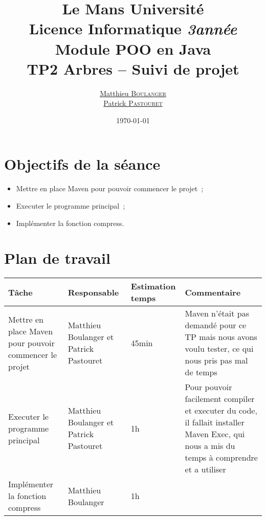 \documentclass[a4paper,11pt]{article}
\title {\textbf {\color {blue} Le Mans Université}\color{black}
\\  Licence Informatique  \textit {3\ieme année}
 \\Module POO en Java
 \\ \textbf {TP2 Arbres – Suivi de projet}}
\author{\href{mailto: matthieu.boulanger.etu@univ-lemans.fr} {Matthieu \textsc{Boulanger}}\\
      \href{mailto: patrick.pastouret.etu@univ-lemans.fr} {Patrick \textsc{Pastouret}}}
\date{\today}
\begin{document}
\maketitle

\section{Objectifs de la séance}
\begin{itemize}
    \item Mettre en place Maven pour pouvoir commencer le projet~;
    \item Executer le programme principal~;
    \item Implémenter la fonction compress.
\end{itemize}

\section{Plan de travail}
\begin{center}
    \begin{tabular}{p{.3\linewidth}p{.3\linewidth}p{.3\linewidth}p{.3\linewidth}}
      \toprule
	Tâche & Responsable & Estimation temps & Commentaire \\
      \midrule
      Mettre en place Maven pour pouvoir commencer le projet & 
      Matthieu Boulanger et Patrick Pastouret & 
      45min & 
      Maven n'était pas demandé pour ce TP mais nous avons voulu tester, ce qui nous pris pas mal de temps \\
      Executer le programme principal &
      Matthieu Boulanger et Patrick Pastouret &
      1h &
      Pour pouvoir facilement compiler et executer du code, il fallait installer Maven Exec, qui nous a mis du temps à comprendre et a utiliser\\
      Implémenter la fonction compress &
      Matthieu Boulanger &
      1h &
      \\
      \bottomrule
   \end{tabular}
\end{center}
\end{document}
